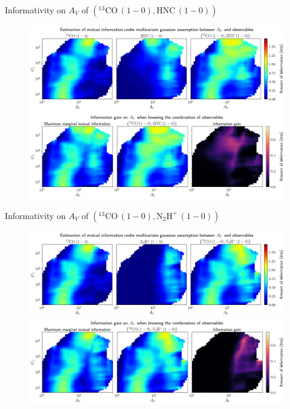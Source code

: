 \documentclass{beamer}
\begin{document}
\begin{frame}{Informativity on $A_V$ of $\left(\mathrm{^{13}CO\,(1-0)},\mathrm{HNC\,(1-0)}\right)$}
    \begin{figure}
        \centering
        \includegraphics[width=0.95\linewidth]{../linearinfo/av__13co10_hnc10_linearinfo.png}
        \vfill
        \includegraphics[width=0.95\linewidth]{../linearinfo/av__13co10_hnc10_linearinfo_gain.png}
    \end{figure}
\end{frame}

\begin{frame}{Informativity on $A_V$ of $\left(\mathrm{^{13}CO\,(1-0)},\mathrm{N_2H^+\,(1-0)}\right)$}
    \begin{figure}
        \centering
        \includegraphics[width=0.95\linewidth]{../linearinfo/av__13co10_n2hp10_linearinfo.png}
        \vfill
        \includegraphics[width=0.95\linewidth]{../linearinfo/av__13co10_n2hp10_linearinfo_gain.png}
    \end{figure}
\end{frame}
\end{document}
